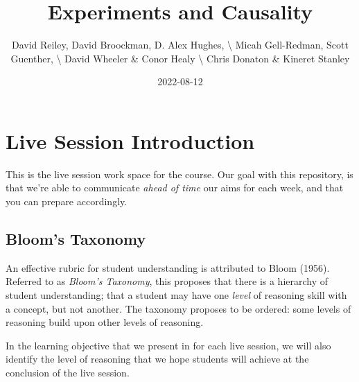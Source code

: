 \documentclass[
]{book}
\title{Experiments and Causality}
\author{David Reiley, David Broockman, D. Alex Hughes, \textbackslash{}
Micah Gell-Redman, Scott Guenther, \textbackslash{} David Wheeler \&
Conor Healy \textbackslash{} Chris Donaton \& Kineret Stanley}
\date{2022-08-12}
\begin{document}
\frontmatter
\maketitle

\mainmatter
\hypertarget{live-session-introduction}{%
\chapter*{Live Session Introduction}\label{live-session-introduction}}

This is the live session work space for the course. Our goal with this
repository, is that we're able to communicate \emph{ahead of time} our
aims for each week, and that you can prepare accordingly.

\hypertarget{blooms-taxonomy}{%
\section*{Bloom's Taxonomy}\label{blooms-taxonomy}}

An effective rubric for student understanding is attributed to Bloom
(1956). Referred to as \emph{Bloom's Taxonomy}, this proposes that there
is a hierarchy of student understanding; that a student may have one
\emph{level} of reasoning skill with a concept, but not another. The
taxonomy proposes to be ordered: some levels of reasoning build upon
other levels of reasoning.

In the learning objective that we present in for each live session, we
will also identify the level of reasoning that we hope students will
achieve at the conclusion of the live session.
\end{document}
